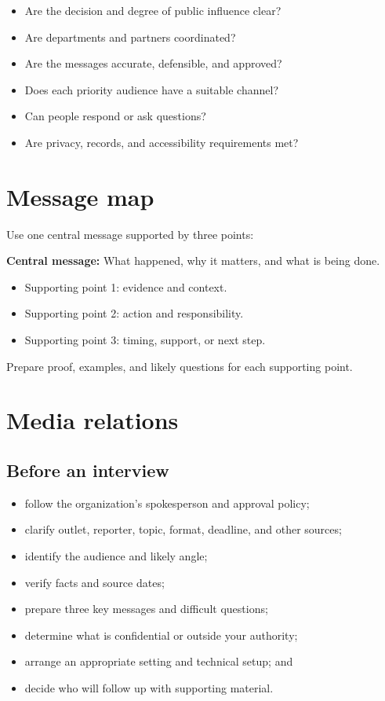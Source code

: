 \documentclass[11pt,letterpaper,oneside,openany]{book}
\begin{document}
\begin{itemize}
\item Are the decision and degree of public influence clear?
\item Are departments and partners coordinated?
\item Are the messages accurate, defensible, and approved?
\item Does each priority audience have a suitable channel?
\item Can people respond or ask questions?
\item Are privacy, records, and accessibility requirements met?
\end{itemize}


\section[Message map]{Message map}
Use one central message supported by three points:


\begin{guidequote}
\textbf{Central message:} What happened, why it matters, and what is being done.

\end{guidequote}


\begin{itemize}
\item Supporting point 1: evidence and context.
\item Supporting point 2: action and responsibility.
\item Supporting point 3: timing, support, or next step.
\end{itemize}


Prepare proof, examples, and likely questions for each supporting point.


\section[Media relations]{Media relations}
\subsection[Before an interview]{Before an interview}
\begin{itemize}
\item follow the organization's spokesperson and approval policy;
\item clarify outlet, reporter, topic, format, deadline, and other sources;
\item identify the audience and likely angle;
\item verify facts and source dates;
\item prepare three key messages and difficult questions;
\item determine what is confidential or outside your authority;
\item arrange an appropriate setting and technical setup; and
\item decide who will follow up with supporting material.
\end{itemize}
\end{document}
